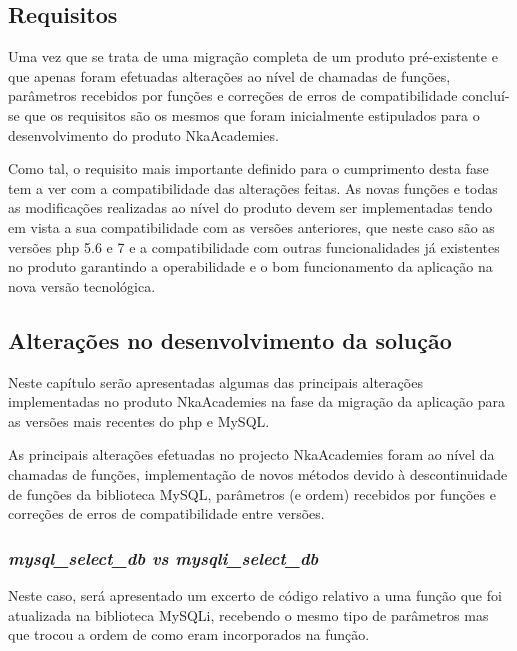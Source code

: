 
\subsection{Requisitos}

Uma vez que se trata de uma migração completa de um produto pré-existente e que apenas foram efetuadas alterações ao nível de chamadas de funções, parâmetros recebidos por funções e correções de erros de compatibilidade concluí-se que os requisitos são os mesmos que foram inicialmente estipulados para o desenvolvimento do produto NkaAcademies.


Como tal, o requisito mais importante definido para o cumprimento desta fase tem a ver com a compatibilidade das alterações feitas. As novas funções e todas as modificações realizadas ao nível do produto devem ser implementadas tendo em vista a sua compatibilidade com as versões anteriores, que neste caso são as versões \acrshort{php} 5.6 e 7 e a compatibilidade com outras funcionalidades já existentes no produto garantindo a operabilidade e o bom funcionamento da aplicação na nova versão tecnológica.



\subsection{Alterações no desenvolvimento da solução}

Neste capítulo serão apresentadas algumas das principais alterações implementadas no produto NkaAcademies na fase da migração da aplicação para as versões mais recentes do \acrshort{php} e MySQL.


As principais alterações efetuadas no projecto NkaAcademies foram ao nível da chamadas de funções, implementação de novos métodos devido à descontinuidade de funções da biblioteca MySQL, parâmetros (e ordem) recebidos por funções e correções de erros de compatibilidade entre versões.

\subsubsection{\textit{mysql\_select\_db vs mysqli\_select\_db}}

Neste caso, será apresentado um excerto de código relativo a uma função que foi atualizada na biblioteca MySQLi, recebendo o mesmo tipo de parâmetros mas que trocou a ordem de como eram incorporados na função.

